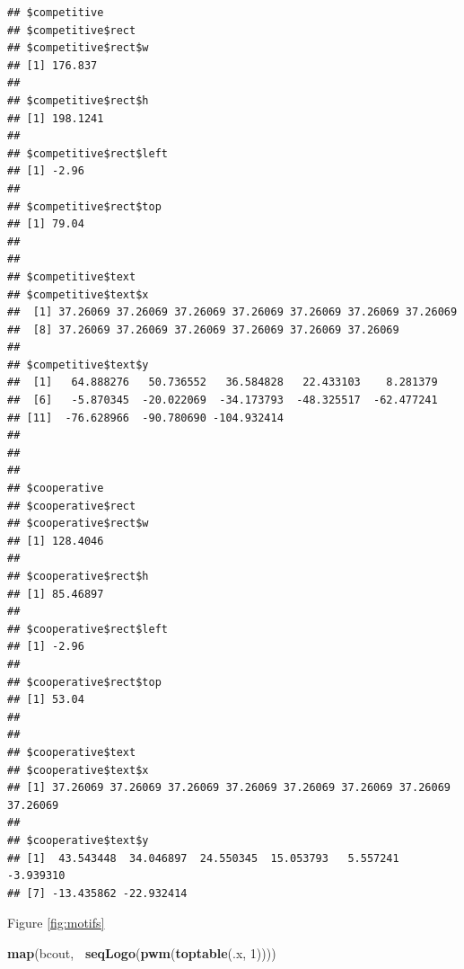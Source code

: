 \documentclass[9pt,a4paper,]{extarticle}
\newenvironment{Shaded}{\begin{snugshade}}{\end{snugshade}}
\newcommand{\DecValTok}[1]{\textcolor[rgb]{0.00,0.00,0.81}{#1}}
\newcommand{\KeywordTok}[1]{\textcolor[rgb]{0.13,0.29,0.53}{\textbf{#1}}}
\newcommand{\NormalTok}[1]{#1}
\newcommand{\OperatorTok}[1]{\textcolor[rgb]{0.81,0.36,0.00}{\textbf{#1}}}
\begin{document}
\begin{verbatim}
## $competitive
## $competitive$rect
## $competitive$rect$w
## [1] 176.837
## 
## $competitive$rect$h
## [1] 198.1241
## 
## $competitive$rect$left
## [1] -2.96
## 
## $competitive$rect$top
## [1] 79.04
## 
## 
## $competitive$text
## $competitive$text$x
##  [1] 37.26069 37.26069 37.26069 37.26069 37.26069 37.26069 37.26069
##  [8] 37.26069 37.26069 37.26069 37.26069 37.26069 37.26069
## 
## $competitive$text$y
##  [1]   64.888276   50.736552   36.584828   22.433103    8.281379
##  [6]   -5.870345  -20.022069  -34.173793  -48.325517  -62.477241
## [11]  -76.628966  -90.780690 -104.932414
## 
## 
## 
## $cooperative
## $cooperative$rect
## $cooperative$rect$w
## [1] 128.4046
## 
## $cooperative$rect$h
## [1] 85.46897
## 
## $cooperative$rect$left
## [1] -2.96
## 
## $cooperative$rect$top
## [1] 53.04
## 
## 
## $cooperative$text
## $cooperative$text$x
## [1] 37.26069 37.26069 37.26069 37.26069 37.26069 37.26069 37.26069 37.26069
## 
## $cooperative$text$y
## [1]  43.543448  34.046897  24.550345  15.053793   5.557241  -3.939310
## [7] -13.435862 -22.932414
\end{verbatim}

Figure \ref{fig:motifs}

\begin{Shaded}
\begin{Highlighting}[]
\KeywordTok{map}\NormalTok{(bcout, }\OperatorTok{~}\KeywordTok{seqLogo}\NormalTok{(}\KeywordTok{pwm}\NormalTok{(}\KeywordTok{toptable}\NormalTok{(.x, }\DecValTok{1}\NormalTok{))))}
\end{Highlighting}
\end{Shaded}
\end{document}
